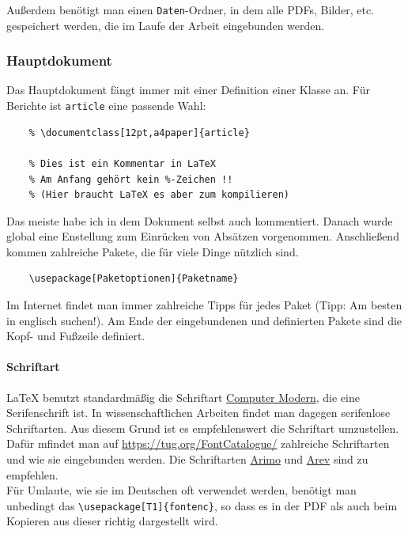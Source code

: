 Außerdem benötigt man einen \verb|Daten|-Ordner, in dem alle PDFs, Bilder, etc. gespeichert werden, die im Laufe der Arbeit eingebunden werden.


\subsubsection{Hauptdokument}

Das Hauptdokument fängt immer mit einer Definition einer Klasse an. Für Berichte ist \verb|article| eine passende Wahl:

\begin{verbatim}
    % \documentclass[12pt,a4paper]{article}
    
    % Dies ist ein Kommentar in LaTeX
    % Am Anfang gehört kein %-Zeichen !! 
    % (Hier braucht LaTeX es aber zum kompilieren)
\end{verbatim}

Das meiste habe ich in dem Dokument selbst auch kommentiert. Danach wurde global eine Enstellung zum Einrücken von Absätzen vorgenommen. Anschließend kommen zahlreiche Pakete, die für viele Dinge nützlich sind.

\begin{verbatim}
    \usepackage[Paketoptionen]{Paketname}
\end{verbatim}

Im Internet findet man immer zahlreiche Tipps für jedes Paket (Tipp: Am besten in englisch suchen!). Am Ende der eingebundenen und definierten Pakete sind die Kopf- und Fußzeile definiert.

\paragraph{Schriftart}

\LaTeX{} benutzt standardmäßig die Schriftart \href{https://de.wikipedia.org/wiki/Computer_Modern}{Computer Modern}, die eine Serifenschrift ist. In wissenschaftlichen Arbeiten findet man dagegen serifenlose Schriftarten. Aus diesem Grund ist es empfehlenswert die Schriftart umzustellen. Dafür mfindet man auf \url{https://tug.org/FontCatalogue/} zahlreiche Schriftarten und wie sie eingebunden werden. Die Schriftarten \href{https://tug.org/FontCatalogue/arimo/}{Arimo} und \href{https://tug.org/FontCatalogue/arev/}{Arev} sind zu empfehlen.\\

Für Umlaute, wie sie im Deutschen oft verwendet werden, benötigt man unbedingt das \verb|\usepackage[T1]{fontenc}|, so dass es in der PDF als auch beim Kopieren aus dieser richtig dargestellt wird.

